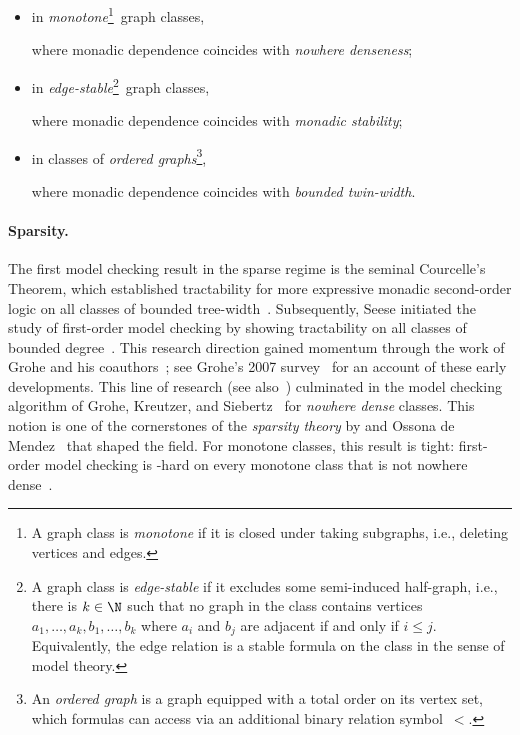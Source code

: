 \newcommand{\footnoteMonotone}{\footnote{A graph class is \emph{monotone} if it is closed under taking subgraphs, i.e., deleting vertices and edges.}}
\newcommand{\footnoteEdgeStable}{\footnote{A graph class is \emph{edge-stable} if it excludes some semi-induced half-graph, i.e., there is $k\in\N$ such that no graph in the class contains vertices $a_1,\ldots,a_k,b_1,\ldots,b_k$ where $a_i$ and $b_j$ are adjacent if and only if $i\le j$. Equivalently, the edge relation is a stable formula on the class in the sense of model theory.}}
\newcommand{\footnoteOrdered}{\footnote{An \emph{ordered graph} is a graph equipped with a total order on its vertex set, which formulas can access via an additional binary relation symbol~$<$.}}

\begin{itemize}
  \item in \emph{monotone}\footnoteMonotone~graph classes,
  \hfill \cite{gks}

  where monadic dependence coincides with \emph{nowhere denseness};\hfill \cite{AdlerA14,podewski1978stable}

  \item in \emph{edge-stable}\footnoteEdgeStable~graph classes,
  \hfill \cite{ms-mc1,ms-mc2}

  where monadic dependence coincides with \emph{monadic stability};
  \hfill \cite{rankwidth-meets-stability}

  \item in classes of \emph{ordered graphs}\footnoteOrdered,
  \hfill \cite{tww4,tww1}

  where monadic dependence coincides with \emph{bounded twin-width}.
  \hfill \cite{tww4}
\end{itemize}

\paragraph*{Sparsity.}
The first model checking result in the sparse regime is the seminal Courcelle's Theorem, which established tractability for more expressive monadic second-order logic on all classes of bounded tree-width~\cite{courcelle1990monadic}.
Subsequently, Seese initiated the study of first-order model checking by showing tractability on all classes of bounded degree~\cite{seese_1996}.
This research direction gained momentum through the work of Grohe and his coauthors~\cite{frick2001deciding,flum2001fixed,dawar2007locally}; see Grohe's 2007 survey~\cite{logic-graphs-algorithms} for an account of these early developments.
This line of research (see also~\cite{dawar2009domination,DvorakKT13-journal,GroheKreutzer2011}) culminated in the model checking algorithm of Grohe, Kreutzer, and Siebertz~\cite{gks} for \emph{nowhere dense} classes.
This notion is one of the cornerstones of the \emph{sparsity theory} by \Nesetril and Ossona de Mendez~\cite{NesetrilM11a,sparsity-book} that shaped the field.
For monotone classes, this result is tight: first-order model checking is \AWstar-hard on every monotone class that is not nowhere dense~\cite{DvorakKT13-journal,dawar2009parameterized}.


